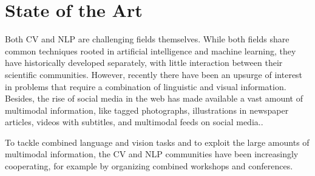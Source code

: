 \chapter{State of the Art}
\label{chapter:state_of_the_art}

Both CV and NLP are challenging fields themselves. While both fields share common techniques rooted in artificial intelligence and machine learning, they have historically developed separately, with little interaction between their scientific communities. However, recently there have been an upsurge of interest in problems that require a combination of linguistic and visual information. Besides, the rise of social media in the web has made available a vast amount of multimodal information, like tagged photographs, illustrations in newspaper articles, videos with subtitles, and multimodal feeds on social media..

To tackle combined language and vision tasks and to exploit the large amounts of multimodal information, the CV and NLP communities have been increasingly cooperating, for example by organizing combined workshops and conferences.